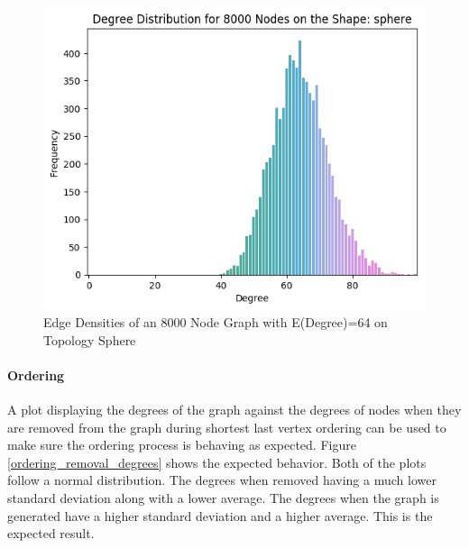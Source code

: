 \documentclass{article}
\begin{document}
    \begin{figure}
      \centering
      \label{sphere_edge_density}
      \includegraphics[width=1 \textwidth]{sphere/generation/edge_density/8000_64.png}
      \caption{Edge Densities of an 8000 Node Graph with E(Degree)=64 on Topology Sphere}
    \end{figure}

    \paragraph{Ordering}
    A plot displaying the degrees of the graph against the degrees of nodes when they are removed from the graph during shortest last vertex ordering can be used to make sure the ordering process is behaving as expected.
    Figure \ref{ordering_removal_degrees} shows the expected behavior.
    Both of the plots follow a normal distribution.
    The degrees when removed having a much lower standard deviation along with a lower average.
    The degrees when the graph is generated have a higher standard deviation and a higher average.
    This is the expected result.
\end{document}
